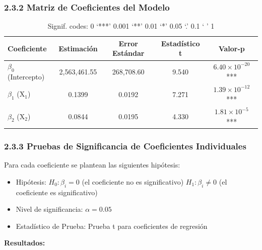 \documentclass[12pt,a4paper]{article}
\begin{document}
\subsubsection*{2.3.2 Matriz de Coeficientes del Modelo}

\begin{table}[H]
\centering
\caption{Matriz de Coeficientes del Modelo de Regresión Múltiple}
\label{tab:coeficientes}
\begin{tabular}{|l|c|c|c|c|}
\hline
\textbf{Coeficiente} & \textbf{Estimación} & \textbf{Error Estándar} & \textbf{Estadístico t} & \textbf{Valor-p} \\ \hline
$\beta_0$ (Intercepto) & 2,563,461.55 & 268,708.60 & 9.540 & $6.40 \times 10^{-20}$ *** \\ \hline
$\beta_1$ (X$_1$) & 0.1399 & 0.0192 & 7.271 & $1.39 \times 10^{-12}$ *** \\ \hline
$\beta_2$ (X$_2$) & 0.0844 & 0.0195 & 4.330 & $1.81 \times 10^{-5}$ *** \\ \hline
\end{tabular}
\caption*{Signif. codes: 0 `***' 0.001 `**' 0.01 `*' 0.05 `.' 0.1 ` ' 1}
\end{table}

\subsubsection*{2.3.3 Pruebas de Significancia de Coeficientes Individuales}

Para cada coeficiente se plantean las siguientes hipótesis:

\begin{itemize}
    \item Hipótesis: \quad $H_0: \beta_i = 0$ (el coeficiente no es significativo) \hspace{1cm} $H_1: \beta_i \neq 0$ (el coeficiente es significativo)
    \item Nivel de significancia: $\alpha = 0.05$
    \item Estadístico de Prueba: Prueba t para coeficientes de regresión
\end{itemize}

\textbf{Resultados:}
\end{document}
